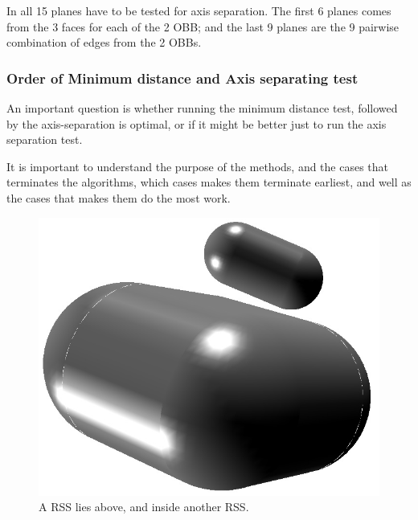 In all 15 planes have to be tested for axis separation. The first 6 planes comes from the 3 faces for each of the 2 OBB; and the last 9 planes are the 9 pairwise combination of edges from the 2 OBBs. 

\subsubsection{Order of Minimum distance and Axis separating test}
\label{minAxisOrder}
An important question is whether running the minimum distance test, followed by the axis-separation is optimal, or if it might be better just to run the axis separation test.

It is important to understand the purpose of the methods, and the cases that terminates the algorithms, which cases makes them terminate earliest, and well as the cases that makes them do the most work.

\begin{figure}
\centering
\includegraphics[width=\textwidth]{figures/sepAxis}
\caption{\label{parallel} A RSS lies above, and inside another RSS.}
\end{figure}

